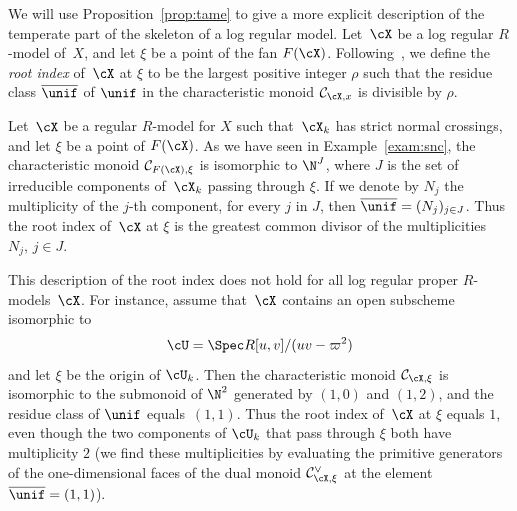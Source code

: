 We will use Proposition~\ref{prop:tame} to give a more explicit description of the temperate part of the skeleton of a log regular model.
Let~$\cX$ be a log regular $R$\nobreakdash-model of~$X$, and let $\xi$ be a point of the fan $F(\cX)$. Following~\cite{logzeta}, we define the {\em root index} of~$\cX$ at $\xi$ to be the largest positive integer $\rho$ such that the residue class $\overline{\unif}$ of $\unif$
in the characteristic monoid $\mathcal{C}_{\cX,x}$ is divisible by $\rho$.

\begin{example}
Let~$\cX$ be a regular $R$\nobreakdash-model for $X$ such that~$\cX_k$ has strict normal crossings, and let $\xi$ be a point of $F(\cX)$.
As we have seen in Example~\ref{exam:snc}, the characteristic monoid $\mathcal{C}_{F(\cX),\xi}$ is isomorphic to $\N^J$, where $J$ is the set of irreducible components of~$\cX_k$ passing through $\xi$. If we denote by $N_j$ the multiplicity of the $j$-th component, for every $j$ in $J$, then $\overline{\unif}=(N_j)_{j\in J}$.
Thus the root index of~$\cX$ at $\xi$ is the greatest common divisor of the multiplicities $N_j,\,j\in J$.

This description of the root index does not hold for all log regular proper $R$\nobreakdash-models~$\cX$. For instance, assume that~$\cX$ contains an open subscheme isomorphic to
\[
\cU=\Spec R[u,v]/(uv-\varpi^2)
\]
and let $\xi$ be the origin of $\cU_k$.
Then the characteristic monoid
$\mathcal{C}_{\cX,\xi}$ is isomorphic to the submonoid of $\N^2$ generated by $(1,0)$ and $(1,2)$, and the residue class of $\unif$ equals~$(1,1)$. Thus the root index of~$\cX$ at $\xi$ equals $1$, even though the two components of $\cU_k$ that pass through $\xi$ both have multiplicity $2$ (we find these multiplicities by evaluating the primitive generators of the one-dimensional faces of the dual monoid $\mathcal{C}^{\vee}_{\cX,\xi}$ at the element $\overline{\unif}=(1,1)$).
\end{example}

